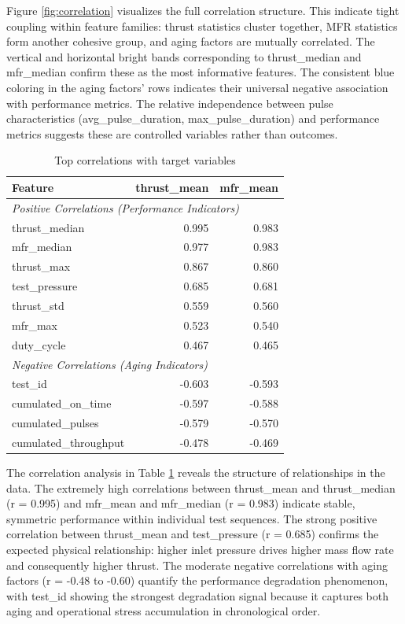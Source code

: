 \documentclass[12pt,a4paper]{article}
\begin{document}
Figure \ref{fig:correlation} visualizes the full correlation structure. This indicate tight coupling within feature families: thrust statistics cluster together, MFR statistics form another cohesive group, and aging factors are mutually correlated. The vertical and horizontal bright bands corresponding to thrust\_median and mfr\_median confirm these as the most informative features. The consistent blue coloring in the aging factors' rows indicates their universal negative association with performance metrics. The relative independence between pulse characteristics (avg\_pulse\_duration, max\_pulse\_duration) and performance metrics suggests these are controlled variables rather than outcomes.

\begin{table}[H]
\centering
\caption{Top correlations with target variables}
\label{tab:correlations}
\small
\begin{tabular}{lrr}
\toprule
\textbf{Feature} & \textbf{thrust\_mean} & \textbf{mfr\_mean} \\
\midrule
\multicolumn{3}{l}{\textit{Positive Correlations (Performance Indicators)}} \\
thrust\_median & 0.995 & 0.983 \\
mfr\_median & 0.977 & 0.983 \\
thrust\_max & 0.867 & 0.860 \\
test\_pressure & 0.685 & 0.681 \\
thrust\_std & 0.559 & 0.560 \\
mfr\_max & 0.523 & 0.540 \\
duty\_cycle & 0.467 & 0.465 \\
\midrule
\multicolumn{3}{l}{\textit{Negative Correlations (Aging Indicators)}} \\
test\_id & -0.603 & -0.593 \\
cumulated\_on\_time & -0.597 & -0.588 \\
cumulated\_pulses & -0.579 & -0.570 \\
cumulated\_throughput & -0.478 & -0.469 \\
\bottomrule
\end{tabular}
\end{table}

The correlation analysis in Table \ref{tab:correlations} reveals the structure of relationships in the data. The extremely high correlations between thrust\_mean and thrust\_median (r = 0.995) and mfr\_mean and mfr\_median (r = 0.983) indicate stable, symmetric performance within individual test sequences. The strong positive correlation between thrust\_mean and test\_pressure (r = 0.685) confirms the expected physical relationship: higher inlet pressure drives higher mass flow rate and consequently higher thrust. The moderate negative correlations with aging factors (r = -0.48 to -0.60) quantify the performance degradation phenomenon, with test\_id showing the strongest degradation signal because it captures both aging and operational stress accumulation in chronological order.
\end{document}
